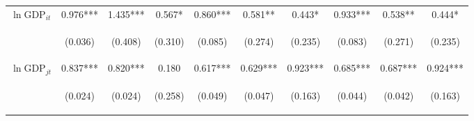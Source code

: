 \documentclass[twoside,a4paper,11pt]{article}
\begin{document}
\begin{table}
{\begin{tabular}{lccc|ccc|ccc}
			$\ln\text{GDP}_{it}$ & 0.976*** & 1.435*** & 0.567* & 0.860*** & 0.581** & 0.443* & 0.933*** & 0.538** & 0.444* \\
			\vspace{4pt} & \begin{footnotesize}(0.036)\end{footnotesize} & \begin{footnotesize}(0.408)\end{footnotesize} & \begin{footnotesize}(0.310)\end{footnotesize} & \begin{footnotesize}(0.085)\end{footnotesize} & \begin{footnotesize}(0.274)\end{footnotesize} & \begin{footnotesize}(0.235)\end{footnotesize} & \begin{footnotesize}(0.083)\end{footnotesize} & \begin{footnotesize}(0.271)\end{footnotesize} & \begin{footnotesize}(0.235)\end{footnotesize} \\
			$\ln\text{GDP}_{jt}$ & 0.837*** & 0.820*** & 0.180 & 0.617*** & 0.629*** & 0.923*** & 0.685*** & 0.687*** & 0.924*** \\
			\vspace{4pt} & \begin{footnotesize}(0.024)\end{footnotesize} & \begin{footnotesize}(0.024)\end{footnotesize} & \begin{footnotesize}(0.258)\end{footnotesize} & \begin{footnotesize}(0.049)\end{footnotesize} & \begin{footnotesize}(0.047)\end{footnotesize} & \begin{footnotesize}(0.163)\end{footnotesize} & \begin{footnotesize}(0.044)\end{footnotesize} & \begin{footnotesize}(0.042)\end{footnotesize} & \begin{footnotesize}(0.163)\end{footnotesize} \\

\end{tabular}}
\end{table}
\end{document}
